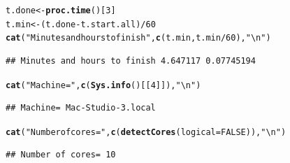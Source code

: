 \documentclass[9pt]{article}\usepackage[]{graphicx}\usepackage[]{xcolor}
\makeatletter
\newcommand{\hlnum}[1]{\textcolor[rgb]{0.686,0.059,0.569}{#1}}%
\newcommand{\hlstr}[1]{\textcolor[rgb]{0.192,0.494,0.8}{#1}}%
\newcommand{\hlopt}[1]{\textcolor[rgb]{0,0,0}{#1}}%
\newcommand{\hlstd}[1]{\textcolor[rgb]{0.345,0.345,0.345}{#1}}%
\newcommand{\hlkwb}[1]{\textcolor[rgb]{0.69,0.353,0.396}{#1}}%
\newcommand{\hlkwc}[1]{\textcolor[rgb]{0.333,0.667,0.333}{#1}}%
\newcommand{\hlkwd}[1]{\textcolor[rgb]{0.737,0.353,0.396}{\textbf{#1}}}%
\newenvironment{kframe}{%
 \def\at@end@of@kframe{}%
 \ifinner\ifhmode%
  \def\at@end@of@kframe{\end{minipage}}%
  \begin{minipage}{\columnwidth}%
 \fi\fi%
 \def\FrameCommand##1{\hskip\@totalleftmargin \hskip-\fboxsep
 \colorbox{shadecolor}{##1}\hskip-\fboxsep
     \hskip-\linewidth \hskip-\@totalleftmargin \hskip\columnwidth}%
 \MakeFramed {\advance\hsize-\width
   \@totalleftmargin\z@ \linewidth\hsize
   \@setminipage}}%
 {\par\unskip\endMakeFramed%
 \at@end@of@kframe}
\newenvironment{knitrout}{}{} %
\theoremstyle{definition}
\theoremstyle{remark}
\makeatother
\begin{document}
\begin{knitrout}
\color{fgcolor}\begin{kframe}
\begin{alltt}
\hlstd{t.done} \hlkwb{<-} \hlkwd{proc.time}\hlstd{()[}\hlnum{3}\hlstd{]}
\hlstd{t.min} \hlkwb{<-} \hlstd{(t.done} \hlopt{-} \hlstd{t.start.all)}\hlopt{/}\hlnum{60}
\hlkwd{cat}\hlstd{(}\hlstr{"Minutes and hours to finish"}\hlstd{,} \hlkwd{c}\hlstd{(t.min, t.min}\hlopt{/}\hlnum{60}\hlstd{),} \hlstr{"\textbackslash{}n"}\hlstd{)}
\end{alltt}
\begin{verbatim}
## Minutes and hours to finish 4.647117 0.07745194
\end{verbatim}
\begin{alltt}
\hlkwd{cat}\hlstd{(}\hlstr{"Machine="}\hlstd{,} \hlkwd{c}\hlstd{(}\hlkwd{Sys.info}\hlstd{()[[}\hlnum{4}\hlstd{]]),} \hlstr{"\textbackslash{}n"}\hlstd{)}
\end{alltt}
\begin{verbatim}
## Machine= Mac-Studio-3.local
\end{verbatim}
\begin{alltt}
\hlkwd{cat}\hlstd{(}\hlstr{"Number of cores="}\hlstd{,} \hlkwd{c}\hlstd{(}\hlkwd{detectCores}\hlstd{(}\hlkwc{logical} \hlstd{=} \hlnum{FALSE}\hlstd{)),} \hlstr{"\textbackslash{}n"}\hlstd{)}
\end{alltt}
\begin{verbatim}
## Number of cores= 10
\end{verbatim}
\end{kframe}
\end{knitrout}
\end{document}
